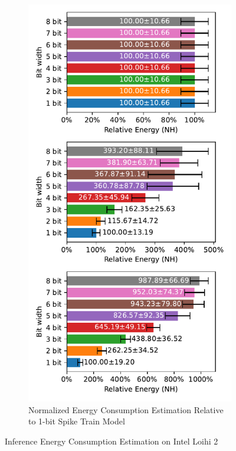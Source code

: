         \begin{figure}[H]
            \centering
            \ContinuedFloat
            \begin{subfigure}[H]{0.7\textwidth}
                \centering
                \includegraphics[width=\textwidth]{../standard/DVSGesture/plots/dvsgesture_test_relative_energy_nh.pdf}
                \caption{Normalized Energy Consumption Estimation Relative to 1-bit Spike Train Model}
            \end{subfigure}
            \caption{Inference Energy Consumption Estimation on Intel Loihi 2}
        \end{figure}

